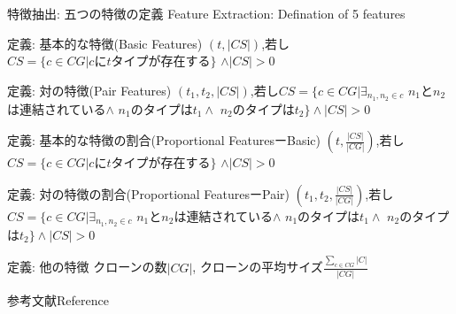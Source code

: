 \begin{frame}[allowdisplaybreaks,shrink=25]{特徴抽出: 五つの特徴の定義}
{Feature Extraction: Defination of 5 features}
\begin{block}{定義: 基本的な特徴(Basic Features)}
$(t,|CS|)$,若し$CS = \{c \in CG | c \textrm{に}t\textrm{タイプが存在する}\}$
$ \wedge |CS|>0$
\end{block}
\begin{block}{定義: 対の特徴(Pair Features)}
$(t_1,t_2,|CS|)$,若し$CS = \{c \in CG | \exists_{n_1,n_2 \in c}$ 
$n_1$と$n_2$は連結されている$\wedge$
$n_1$のタイプは$t_1 \wedge$
$n_2$のタイプは$t_2\} \wedge |CS|>0$
\end{block}
\begin{block}{定義: 基本的な特徴の割合(Proportional FeaturesーBasic)}
$(t,\frac{|CS|}{|CG|})$,若し$CS = \{c \in CG | c \textrm{に}t\textrm{タイプが存在する}\}$
$ \wedge |CS|>0$
\end{block}
\begin{block}{定義: 対の特徴の割合(Proportional FeaturesーPair)}
$(t_1,t_2,\frac{|CS|}{|CG|})$,若し$CS = \{c \in CG | \exists_{n_1,n_2 \in c}$ 
$n_1$と$n_2$は連結されている$\wedge$
$n_1$のタイプは$t_1 \wedge$
$n_2$のタイプは$t_2\} \wedge |CS|>0$
\end{block}
\begin{block}{定義: 他の特徴}
クローンの数$|CG|$, クローンの平均サイズ$\frac{\sum_{c \in CG}|C|}{|CG|}$
\end{block}
\end{frame}
\begin{frame}[allowframebreaks]{参考文献}{Reference}
{\scriptsize


}
\end{frame}

\backupend


